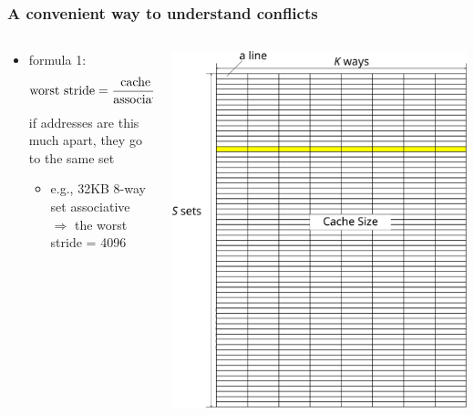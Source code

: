 \documentclass[12pt,dvipdfmx]{beamer}
\newcommand{\aka}[1]{{\color{red}#1}}
\begin{document}
\begin{frame}
  \frametitle{A convenient way to understand conflicts}
\begin{columns}
  \begin{column}{0.6\textwidth}
    \begin{itemize}
    \item formula 1: 
      \[ \mbox{\aka{worst stride}} = \frac{\mbox{cache size}}{\mbox{associativity}} \mbox{ bytes} \]
      if addresses are this much apart,
      they go to the same set

      \begin{itemize}
      \item e.g., 32KB 8-way set associative
        $\Rightarrow$ the worst stride = 4096
      \end{itemize}
    \end{itemize}
  \end{column}

  \begin{column}{0.4\textwidth}
    \begin{center}
      \includegraphics[width=1.0\textwidth]{out/pdf/svg/conflict_2.pdf}
    \end{center}
  \end{column}

\end{columns}
\end{frame}
\end{document}
